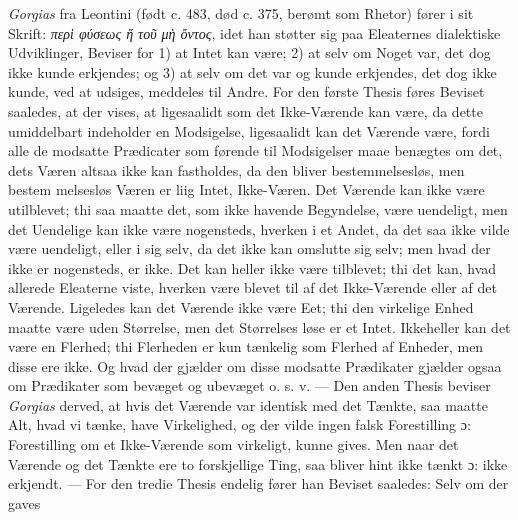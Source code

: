 \documentclass[12pt,a4paper]{book}
\newcommand{\divrule}{\begin{center}\rule{2cm}{0.4pt}\end{center}}
\newcommand{\gk}[1]{\textit{#1}}
\begin{document}
\emph{Gorgias} fra Leontini (født c. 483, død c. 375, berømt som
Rhetor) fører i sit Skrift: \gk{περὶ φύσεως ἤ τοῦ μὴ ὄντος}, idet
han støtter sig paa Eleaternes dialektiske Udviklinger, Beviser
for 1) at Intet kan være; 2) at selv om Noget var, det dog
ikke kunde erkjendes; og 3) at selv om det var og kunde
erkjendes, det dog ikke kunde, ved at udsiges, meddeles til
Andre. For den første Thesis føres Beviset saaledes, at der
vises, at ligesaalidt som det Ikke-Værende kan være, da dette
umiddelbart indeholder en Modsigelse, ligesaalidt kan det
Værende være, fordi alle de modsatte Prædicater som førende
til Modsigelser maae benægtes om det, dets Væren altsaa ikke
kan fastholdes, da den bliver bestemmelsesløs, men bestem\-%
melsesløs Væren er liig Intet, Ikke-Væren. Det Værende kan
ikke være utilblevet; thi saa maatte det, som ikke havende
Begyndelse, være uendeligt, men det Uendelige kan ikke være
nogensteds, hverken i et Andet, da det saa ikke vilde være
uendeligt, eller i sig selv, da det ikke kan omslutte sig selv;
men hvad der ikke er nogensteds, er ikke. Det kan heller
ikke være tilblevet; thi det kan, hvad allerede Eleaterne viste,
hverken være blevet til af det Ikke-Værende eller af det
Værende. Ligeledes kan det Værende ikke være Eet; thi den
virkelige Enhed maatte være uden Størrelse, men det Størrelses\-%
løse er et Intet. Ikkeheller kan det være en Flerhed; thi
Flerheden er kun tænkelig som Flerhed af Enheder, men disse
ere ikke. Og hvad der gjælder om disse modsatte Prædikater
gjælder ogsaa om Prædikater som bevæget og ubevæget o. s. v.
--- Den anden Thesis beviser \emph{Gorgias} derved, at hvis det
Værende var identisk med det Tænkte, saa maatte Alt, hvad
vi tænke, have Virkelighed, og der vilde ingen falsk Forestilling
ɔ: Forestilling om et Ikke-Værende som virkeligt, kunne gives.
Men naar det Værende og det Tænkte ere to forskjellige Ting,
saa bliver hint ikke tænkt ɔ: ikke erkjendt. --- For den tredie
Thesis endelig fører han Beviset saaledes: Selv om der gaves
\setcounter{footnote}{0}
\end{document}
